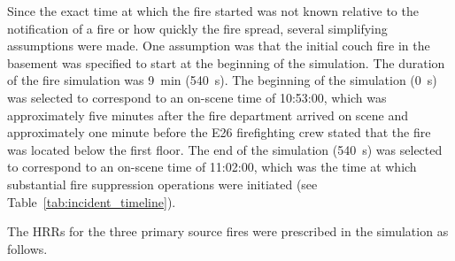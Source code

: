 \documentclass[12pt,oneside]{book}
\begin{document}
\clearpage


Since the exact time at which the fire started was not known relative to the notification of a fire or how quickly the fire spread, several simplifying assumptions were made. One assumption was that the initial couch fire in the basement was specified to start at the beginning of the simulation. The duration of the fire simulation was 9~min (540~s). The beginning of the simulation (0~s) was selected to correspond to an on-scene time of 10:53:00, which was approximately five minutes after the fire department arrived on scene and approximately one minute before the E26 firefighting crew stated that the fire was located below the first floor. The end of the simulation (540~s) was selected to correspond to an on-scene time of 11:02:00, which was the time at which substantial fire suppression operations were initiated (see Table~\ref{tab:incident_timeline}).

The HRRs for the three primary source fires were prescribed in the simulation as follows.
\end{document}
